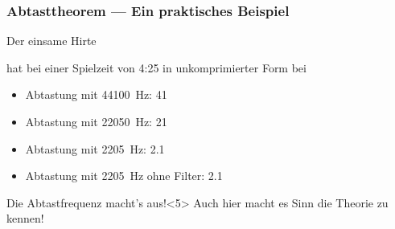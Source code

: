 \begin{frame}
	\frametitle{Abtasttheorem --- Ein praktisches Beispiel}

	\begin{block}{Der einsame Hirte}

		hat bei einer Spielzeit von 4:25 in unkomprimierter Form bei

		\begin{itemize}
			\item<1-> Abtastung mit \SI{44100}{\hertz}: \SI{41}{\mega\byte}
			\item<2-> Abtastung mit \SI{22050}{\hertz}: \SI{21}{\mega\byte}
			\item<3-> Abtastung mit \phantom{2}\SI{2205}{\hertz}: \phantom{2}\SI{2.1}{\mega\byte}
			\item<4-> Abtastung mit \phantom{2}\SI{2205}{\hertz} ohne Filter: \SI{2.1}{\mega\byte}

		\end{itemize}
	\end{block}

	\medskip

	\begin{block}{Die Abtastfrequenz macht's aus!}<5>
		Auch hier macht es Sinn die Theorie zu kennen!
	\end{block}
\end{frame}

